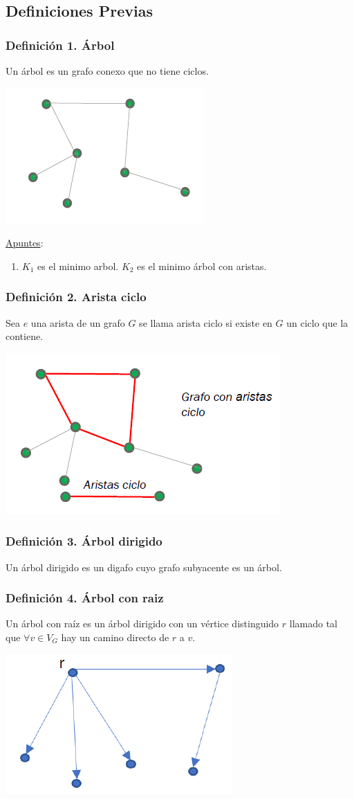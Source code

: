 \documentclass{article}
\begin{document}
\subsection{Definiciones Previas}
\subsubsection*{Definición 1. Árbol}
Un árbol es un grafo conexo que no tiene ciclos.
\begin{center}
    \includegraphics[width=.30\textwidth]{arbol.PNG}
\end{center}
\underline{Apuntes}:
\begin{enumerate}
    \item $K_1$ es el minimo arbol. $K_2$ es el minimo árbol con aristas.
\end{enumerate}

\subsubsection*{Definición 2. Arista ciclo}
Sea $e$ una arista de un grafo $G$ se llama arista ciclo si existe en $G$ un ciclo que la contiene.
\begin{center}
    \includegraphics[width=.40\textwidth]{aristaCiclo.PNG}
\end{center}

\subsubsection*{Definición 3. Árbol dirigido}
Un árbol dirigido es un digafo cuyo grafo subyacente es un árbol.

\subsubsection*{Definición 4. Árbol con raiz}
Un árbol con raíz es un árbol dirigido con un vértice distinguido $r$ llamado tal que $\forall v \in V_G$ hay un camino directo de $r$ a $v$.
\begin{center}
    \includegraphics[width=.30\textwidth]{arbolConRaiz.PNG}
\end{center}
\end{document}
